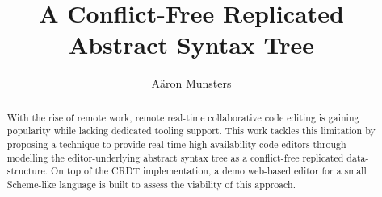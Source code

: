 \documentclass[sigplan,screen,10pt]{acmart}
\begin{document}

    \title{A Conflict-Free Replicated Abstract Syntax Tree}

    \author{A\"aron Munsters}

        \begin{abstract}
            With the rise of remote work, remote real-time collaborative code editing is gaining popularity while
            lacking dedicated tooling support.
            This work tackles this limitation by proposing a technique to provide real-time high-availability code
            editors through modelling the editor-underlying abstract syntax tree as a conflict-free replicated
            data-structure.
            On top of the CRDT implementation, a demo web-based editor for a small Scheme-like language is built to
            assess the viability of this approach.
        \end{abstract}

    \maketitle
    \pagestyle{plain} %

    

    

    

    

    

    

    

    



    
    
\end{document}

